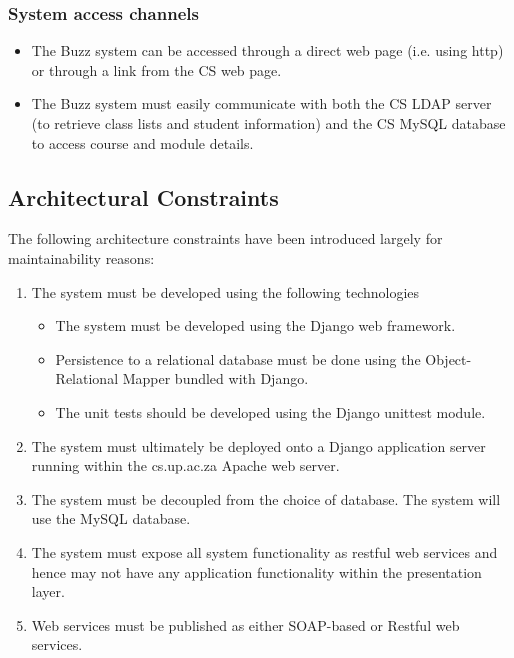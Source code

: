 \documentclass[12pt, oneside]{article}
\begin{document}
				\subsubsection{System access channels}
				\begin{itemize}
					\item The Buzz system can be accessed through a direct web page (i.e. using http) or through a link from the CS web page.
					\item The Buzz system must easily communicate with both the CS LDAP server (to retrieve class lists and student information) and the CS MySQL database to access course and module details.
				\end{itemize}
	\subsection{Architectural Constraints}		
	The following architecture constraints have been introduced largely for maintainability reasons:
\begin{enumerate}
	\item The system must be developed using the following technologies
	\begin{itemize}
		\item The system must be developed using the Django web framework.
		\item Persistence to a relational database must be done using the Object-Relational Mapper bundled with Django.
		\item The unit tests should be developed using the Django unittest module.
	\end{itemize}

	\item The system must ultimately be deployed onto a Django application server running within the cs.up.ac.za Apache web server.
	\item The system must be decoupled from the choice of database. The system will use the MySQL database.
	\item The system must expose all system functionality as restful web services and hence may not have any application functionality within the presentation layer.
	\item Web services must be published as either SOAP-based or Restful web services.
\end{enumerate}
\end{document}
